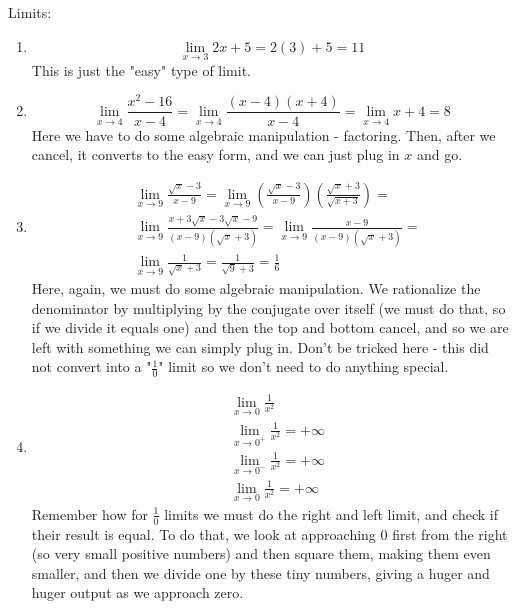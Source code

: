 Limits:
\begin{enumerate}
\item \begin{equation*}
    \lim\limits_{x\rightarrow 3} 2x+5 = 2(3)+5 = 11
\end{equation*} This is just the "easy" type of limit.
\item \begin{equation*}
    \lim\limits_{x\rightarrow 4}\frac{x^2-16}{x-4} = \lim\limits_{x\rightarrow 4}\frac{(x-4)(x+4)}{x-4} = \lim\limits_{x\rightarrow 4}x+4 = 8
\end{equation*} Here we have to do some algebraic manipulation - factoring. Then, after we cancel, it converts to the easy form, and we can just plug in $x$ and go.
\item \begin{align*}
    & \lim\limits_{x\rightarrow 9}\frac{\sqrt{x}-3}{x-9}=  \lim\limits_{x\rightarrow 9}\left(\frac{\sqrt{x}-3}{x-9}\right) \left(\frac{\sqrt{x}+3}{\sqrt{x+3}}\right) = \\  &\lim\limits_{x\rightarrow 9} \frac{x+3\sqrt{x}-3\sqrt{x}-9}{(x-9) (\sqrt{x}+3)}=\lim\limits_{x\rightarrow 9}\frac{x-9}{(x-9)(\sqrt{x}+3)} = \\ & \lim\limits_{x\rightarrow 9}\frac{1}{\sqrt{x}+3} =\frac{1}{\sqrt{9}+3}=\frac{1}{6}
\end{align*}
Here, again, we must do some algebraic manipulation. 
We rationalize the denominator by multiplying by the conjugate over itself (we must do that, so if we divide it equals one) and then the top and bottom cancel, and so we are left with something we can simply plug in. 
Don't be tricked here - this did not convert into a "$\frac{1}{0}$" limit so we don't need to do anything special.
\item \begin{align*}
    &\lim\limits_{x\rightarrow 0} \frac{1}{x^2}\\
    &\lim\limits_{x\rightarrow 0^+} \frac{1}{x^2} = +\infty\\
    &\lim\limits_{x\rightarrow 0^-} \frac{1}{x^2} = +\infty\\
    &\lim\limits_{x\rightarrow 0} \frac{1}{x^2} = +\infty
\end{align*}
Remember how for $\frac{1}{0}$ limits we must do the right and left limit, and check if their result is equal. 
To do that, we look at approaching $0$ first from the right (so very small positive numbers) and then square them, making them even smaller, and then we divide one by these tiny numbers, giving a huger and huger output as we approach zero. 

\end{enumerate}
